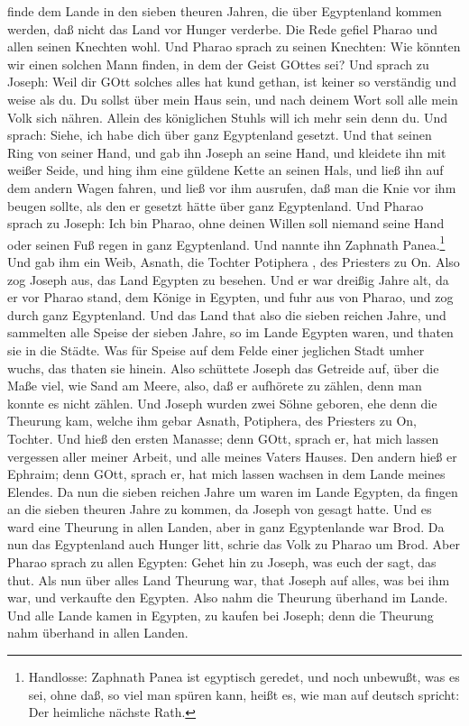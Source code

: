 \begin{schriftzitat}
finde dem Lande in den sieben theuren Jahren, die über Egyptenland kommen werden, daß nicht das Land vor Hunger verderbe. Die Rede gefiel Pharao und allen seinen Knechten wohl. Und Pharao sprach zu seinen Knechten: Wie könnten wir einen solchen Mann finden, in dem der Geist GOttes sei? Und sprach zu Joseph: Weil dir GOtt solches alles hat kund gethan, ist keiner so verständig und weise als du. Du sollst über mein Haus sein, und nach deinem Wort soll alle mein Volk sich nähren. Allein des königlichen Stuhls will ich mehr sein denn du. Und sprach: Siehe, ich habe dich über ganz Egyptenland gesetzt. Und that seinen Ring von seiner Hand, und gab ihn Joseph an seine Hand, und kleidete ihn mit weißer Seide, und hing ihm eine güldene Kette an seinen Hals, und ließ ihn auf dem andern Wagen fahren, und ließ vor ihm ausrufen, daß man die Knie vor ihm beugen sollte, als den er gesetzt hätte über ganz Egyptenland. Und Pharao sprach zu Joseph: Ich bin Pharao, ohne deinen Willen soll niemand seine Hand oder seinen Fuß regen in ganz Egyptenland. Und nannte ihn Zaphnath Panea.\footnote{Handlosse: Zaphnath Panea ist egyptisch geredet, und noch unbewußt, was es sei, ohne daß, so viel man spüren kann, heißt es, wie man auf deutsch spricht: Der heimliche nächste Rath.} Und gab ihm ein Weib, Asnath, die Tochter Potiphera
, des Priesters zu On. Also zog Joseph aus, das Land Egypten zu besehen. Und er war dreißig Jahre alt, da er vor Pharao stand, dem Könige in Egypten, und fuhr aus von Pharao, und zog durch ganz Egyptenland. Und das Land that also die sieben reichen Jahre, und sammelten alle Speise der sieben Jahre, so im Lande Egypten waren, und thaten sie in die Städte. Was für Speise auf dem Felde einer jeglichen Stadt umher wuchs, das thaten sie hinein. Also schüttete Joseph das Getreide auf, über die Maße viel, wie Sand am Meere, also, daß er aufhörete zu zählen, denn man konnte es nicht zählen. Und Joseph wurden zwei Söhne geboren, ehe denn die Theurung kam, welche ihm gebar Asnath, Potiphera, des Priesters zu On, Tochter. Und hieß den ersten Manasse; denn GOtt, sprach er, hat mich lassen vergessen aller meiner Arbeit, und alle meines Vaters Hauses. Den andern hieß er Ephraim; denn GOtt, sprach er, hat mich lassen wachsen in dem Lande meines Elendes. Da nun die sieben reichen Jahre um waren im Lande Egypten, da fingen an die sieben theuren Jahre zu kommen, da Joseph von gesagt hatte. Und es ward eine Theurung in allen Landen, aber in ganz Egyptenlande war Brod. Da nun das Egyptenland auch Hunger litt, schrie das Volk zu Pharao um Brod. Aber Pharao sprach zu allen Egypten: Gehet hin zu Joseph, was euch der sagt, das thut. Als nun über alles Land Theurung war, that Joseph auf alles, was bei ihm war, und verkaufte den Egypten. Also nahm die Theurung überhand im Lande. Und alle Lande kamen in Egypten, zu kaufen bei Joseph; denn die Theurung nahm überhand in allen Landen.
\end{schriftzitat}

